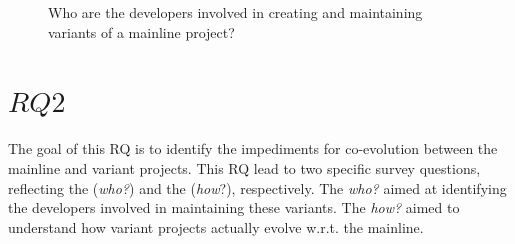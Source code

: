 \begin{figure}[ht]
\centering
\vspace{-.3cm}
    \hfill
    \hfill
    \hfill
    \caption{Who are the developers involved in creating and maintaining variants of a mainline project?}
     \label{fig:original_common}
     \vspace{-.3cm}
\end{figure}



\section{$RQ2$}
\label{sec:results-RQ2}
\textbf{\RQTwo} The goal of this RQ is to identify the impediments for co-evolution between the mainline and variant projects.
This RQ lead to two specific survey questions, reflecting the (\textit{who?}) and the (\textit{how}?), respectively. The \textit{who?} aimed at identifying the developers involved in maintaining these variants. The \textit{how?} aimed to understand how variant  projects actually evolve  w.r.t. the  mainline.


